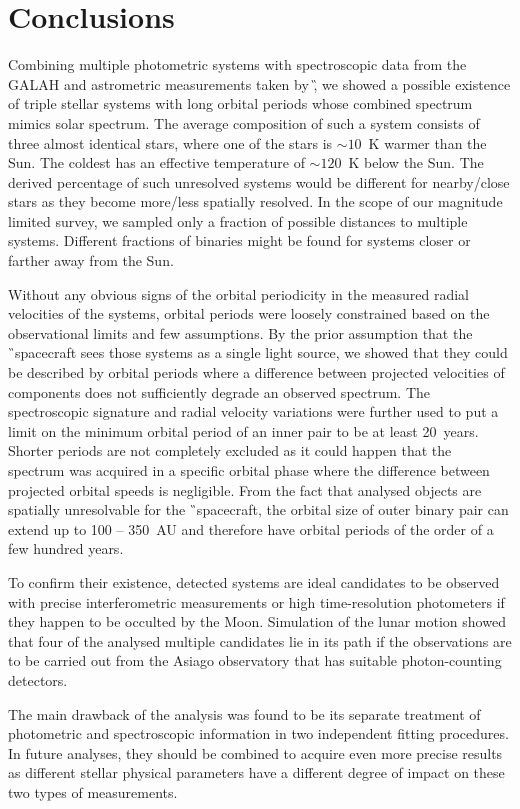 \section{Conclusions}
\label{sec:concl}
Combining multiple photometric systems with spectroscopic data from the GALAH and astrometric measurements taken by \G, we showed a possible existence of triple stellar systems with long orbital periods whose combined spectrum mimics solar spectrum. The average composition of such a system consists of three almost identical stars, where one of the stars is $\sim10$~K warmer than the Sun. The coldest has an effective temperature of $\sim120$~K below the Sun. The derived percentage of such unresolved systems would be different for nearby/close stars as they become more/less spatially resolved. In the scope of our magnitude limited survey, we sampled only a fraction of possible distances to multiple systems. Different fractions of binaries might be found for systems closer or farther away from the Sun.

Without any obvious signs of the orbital periodicity in the measured radial velocities of the systems, orbital periods were loosely constrained based on the observational limits and few assumptions. By the prior assumption that the \G\ spacecraft sees those systems as a single light source, we showed that they could be described by orbital periods where a difference between projected velocities of components does not sufficiently degrade an observed spectrum. The spectroscopic signature and radial velocity variations were further used to put a limit on the minimum orbital period of an inner pair to be at least 20~years. Shorter periods are not completely excluded as it could happen that the spectrum was acquired in a specific orbital phase where the difference between projected orbital speeds is negligible. From the fact that analysed objects are spatially unresolvable for the \G\ spacecraft, the orbital size of outer binary pair can extend up to 100 -- 350~AU and therefore have orbital periods of the order of a few hundred years.

To confirm their existence, detected systems are ideal candidates to be observed with precise interferometric measurements or high time-resolution photometers if they happen to be occulted by the Moon. Simulation of the lunar motion showed that four of the analysed multiple candidates lie in its path if the observations are to be carried out from the Asiago observatory that has suitable photon-counting detectors.

The main drawback of the analysis was found to be its separate treatment of photometric and spectroscopic information in two independent fitting procedures. In future analyses, they should be combined to acquire even more precise results as different stellar physical parameters have a different degree of impact on these two types of measurements.

